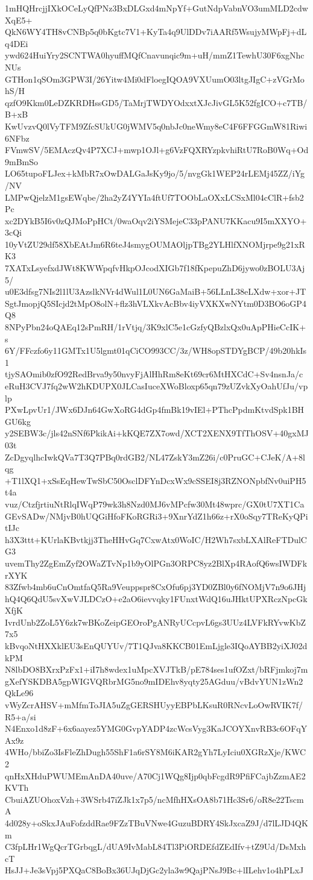 1mHQHrcjjIXkOCeLyQfPNz3BxDLGxd4mNpYf+GutNdpVabnVO3umMLD2cdwXqE5+
QkN6WY4TH8vCNBp5q0bKgtc7V1+KyTa4q9UlDDv7iAARf5WsujyMWpFj+dLq4DEi
ywd624HuiYry2SCNTWA0hyuffMQfCnavunqic9m+uH/mmZ1TewhU30F6xgNhcNUs
GTHon1qSOm3GPW3I/26Yitw4Mi0dFloegIQOA9VXUumO03ltgJIgC+zVGrMohS/H
qzfO9Kkm0LeDZKRDHssGD5/TaMrjTWDYOdxxtXJcJivGL5K52fgICO+c7TB/B+xB
KwUvzvQ0lVyTFM9ZfcSUkUG0jWMV5q0nbJc0neWmy8eC4F6FFGGmW81Riwi6NFbz
FVmwSV/5EMAczQv4P7XCJ+mwp1OJl+g6VzFQXRYzpkvhiRtU7RoB0Wq+Od9mBmSo
LO65tupoFLJex+kMbR7xOwDALGaJsKy9jo/5/nvgGk1WEP24rLEMj45ZZ/iYg/NV
LMPwQjelzM1gsEWqbe/2ha2yZ4YYIa4ftUf7TOObLaOXxLCSxMl04cClR+fsb2Pc
xc2DYkB5I6v0zQJMoPpHCt/0waOqv2iYSMejeC33pPANU7KKacu9I5mXXYO+3cQi
10yVtZU29df58XbEAtJm6R6teJ4smygOUMAOljpTBg2YLHlfXNOMjrpe9g21xRK3
7XATxLsyefxdJWt8KWWpqfvHkpOJcodXIGb7f18fKpepuZhD6jywo0zBOLU3Aj5/
u0E3dfsg7NIs2l1lU3AzslkNVr4dWul1L0UN6GaMaiB+56LLnL38eLXdw+xor+JT
SgtJmopjQ5SIcjd2tMpO8olN+flz3hVLXkvAcBbv4iyVXKXwNYtm0D3BO6oGP4Q8
8NPyPbn24oQAEq12sPmRH/1rVtjq/3K9xlC5e1cGzfyQBzlxQx0uApPHieCcIK+s
6Y/FFczfo6y11GMTx1U5lgmt01qCiCO993CC/3z/WH8opSTDYgBCP/49b20hkIs1
tjySAOmib0zfO92RedBrva9y50nvyFjAlHhRm8eKt69cr6MtHXCdC+Sv4nsnJa/c
eRuH3CVJ7fq2wW2hKDUPX0JLCasIuceXWoBloxp65qn79zUZvkXyOahUfJu/vplp
PXwLpvUr1/JWx6DJn64GwXoRG4dGp4fmBk19vIEl+PThcPpdmKtvdSpk1BHGU6kg
y2SEBW3c/jls42nSNf6PkikAi+kKQE7ZX7owd/XCT2XENX9TfThOSV+40gxMJ03t
ZcDgyqlhcIwkQVa7T3Q7PBq0rdGB2/NL47ZskY3mZ26i/c0PruGC+CJeK/A+8lqg
+T1lXQ1+xSsEqHewTwSbC50OsclDFYnDcxWx9cSSEI8j3RZNONpbfNv0uiPH5t4a
vuz/CtzfjrtiuNtRlqIWqP79wk3h8Nzd0MJ6vMPcfw30Mt48wprc/GX0tU7XT1Ca
GEvSADw/NMjvB0hUQGiHfoFKoRGRi3+9XnrYdZ1h66z+rX0oSqy7TReKyQPitIJc
h3X3ttt+KUrlaKBvtkjj3TheHHvGq7CxwAtx0WoIC/H2Wh7sxbLXAlReFTDulCG3
uvemThy2ZgEmZyf2OWaZTvNp1b9yOlPGn3ORPC8yz2BlXp4RAofQ6wsIWDFkrXYK
83Zfwb4mb6uCnOmtfaQ5Ra9Veuppspr8CxOfu6pj3YD0ZBl0y6fNOMjV7n9o6JHj
hQ4Q6QdU5svXwVJLDCzO+e2aO6ievvqky1FUnxtWdQ16uJHktUPXRczNpcGkXfjK
IvrdUnb2ZoL5Y6zk7wBKoZeipGEOroPgANRyUCcpvL6gs3UUz4LVFkRYvwKbZ7x5
kBvqoNtHXXklEU3sEnQUYUv/7T1QJva8KKCB01EmLjgle3IQoAYBB2yiXJ02dkPM
N8lbDO8BXrxPzFx1+iI7h8wdex1uMpcXVJTkB/pE784ses1ufOZxt/bRFjmkoj7m
gXefYSKDBA5gpWIGVQRbrMG5no9mIDEhv8yqty25AGduu/vBdvYUN1zWn2QkLe96
vWyZcrAHSV+mMfmToJIA5uZgGERSHUyyEBPbLKsuR0RNcvLoOwRVIK7f/R5+a/si
N4Enxo1d8zF+6x6aayez5YMG0GvpYADP4zcWcsVyg3KaJCOYXnvRB3c6OFqYAx9z
4WHo/bbiZo3IsFleZhDugh55ShF1a6rSY8M6iKAR2gYh7LyIciu0XGRzXje/KWC2
qnHxXHduPWUMEmAnDA40uve/A70Cj1WQg8Ijp0qbFcgdR9PfiFCajbZzmAE2KVTh
CbuiAZUOhoxVzh+3WSrb47iZJk1x7p5/ncMfhHXsOA8b71Hc3Sr6/oR8e22TscmA
4d028y+oSkxJAuFofzddRae9FZzTBuVNwe4GuzuBDRY4SkJxcaZ9J/d7lLJD4QKm
C3fpLHr1WgQcrTGrbqgL/dUA9IvMabL84Tl3PiORDEfdZEdIfv+tZ9Ud/DsMxhcT
HsJJ+Je3sVpj5PXQaC8BoBx36UJqDjGc2yla3w9QajPNsJ9Bc+lILehv1o4hPLxJ
